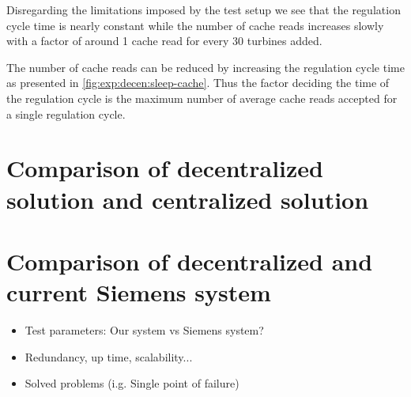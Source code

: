 Disregarding the limitations imposed by the test setup we see that the regulation cycle time is nearly constant while the number of cache reads increases slowly with a factor of around 1 cache read for every 30 turbines added.

The number of cache reads can be reduced by increasing the regulation cycle time as presented in \cref{fig:exp:decen:sleep-cache}.
Thus the factor deciding the time of the regulation cycle is the maximum number of average cache reads accepted for a single regulation cycle.

\section{Comparison of decentralized solution and centralized solution}

\section{Comparison of decentralized and current Siemens system}

\begin{itemize}
	\item Test parameters: Our system vs Siemens system?
	\item Redundancy, up time, scalability...
	\item Solved problems (i.g. Single point of failure)
\end{itemize}